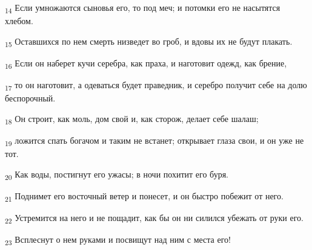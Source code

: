\begin{tcolorbox}
\textsubscript{14} Если умножаются сыновья его, то под меч; и потомки его не насытятся хлебом.
\end{tcolorbox}
\begin{tcolorbox}
\textsubscript{15} Оставшихся по нем смерть низведет во гроб, и вдовы их не будут плакать.
\end{tcolorbox}
\begin{tcolorbox}
\textsubscript{16} Если он наберет кучи серебра, как праха, и наготовит одежд, как брение,
\end{tcolorbox}
\begin{tcolorbox}
\textsubscript{17} то он наготовит, а одеваться будет праведник, и серебро получит себе на долю беспорочный.
\end{tcolorbox}
\begin{tcolorbox}
\textsubscript{18} Он строит, как моль, дом свой и, как сторож, делает себе шалаш;
\end{tcolorbox}
\begin{tcolorbox}
\textsubscript{19} ложится спать богачом и таким не встанет; открывает глаза свои, и он уже не тот.
\end{tcolorbox}
\begin{tcolorbox}
\textsubscript{20} Как воды, постигнут его ужасы; в ночи похитит его буря.
\end{tcolorbox}
\begin{tcolorbox}
\textsubscript{21} Поднимет его восточный ветер и понесет, и он быстро побежит от него.
\end{tcolorbox}
\begin{tcolorbox}
\textsubscript{22} Устремится на него и не пощадит, как бы он ни силился убежать от руки его.
\end{tcolorbox}
\begin{tcolorbox}
\textsubscript{23} Всплеснут о нем руками и посвищут над ним с места его!
\end{tcolorbox}
